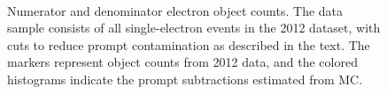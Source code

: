 \begin{figure}
{	
	\label{f:denlinscale}
  } \\
  \caption{Numerator and denominator electron object counts. The data sample consists of all single-electron events in the 2012 dataset, with cuts to reduce prompt contamination as described in the text. The markers represent object counts from 2012 data, and the colored histograms indicate the prompt subtractions estimated from MC.}
  \label{fig:el-ff-data-prompt-subtractions}
\end{figure}

